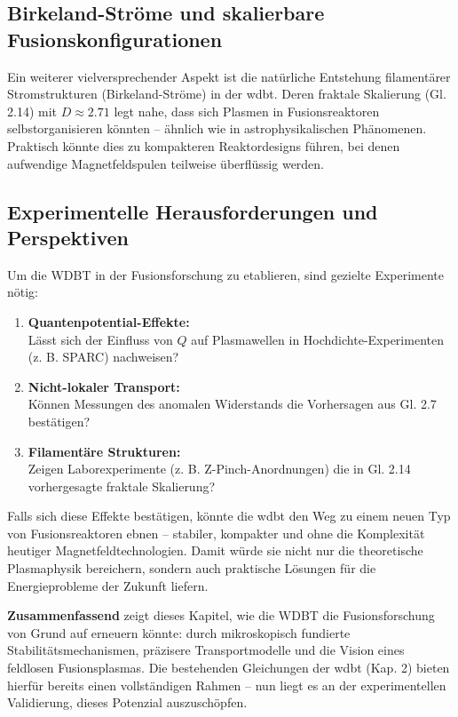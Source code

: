 \subsection{Birkeland-Ströme und skalierbare Fusionskonfigurationen}
Ein weiterer vielversprechender Aspekt ist die natürliche Entstehung filamentärer Stromstrukturen (Birkeland-Ströme) in der \gls{wdbt}. Deren fraktale Skalierung (Gl. 2.14) mit
$D \approx 2.71$ legt nahe, dass sich Plasmen in Fusionsreaktoren selbstorganisieren könnten – ähnlich wie in astrophysikalischen Phänomenen. Praktisch könnte dies zu kompakteren
Reaktordesigns führen, bei denen aufwendige Magnetfeldspulen teilweise überflüssig werden.

\subsection{Experimentelle Herausforderungen und Perspektiven}
Um die WDBT in der Fusionsforschung zu etablieren, sind gezielte Experimente nötig:

\begin{enumerate}
    \item \textbf{Quantenpotential-Effekte:}\\Lässt sich der Einfluss von $Q$ auf Plasmawellen in Hochdichte-Experimenten (z. B. SPARC) nachweisen?
    \item \textbf{Nicht-lokaler Transport:}\\Können Messungen des anomalen Widerstands die Vorhersagen aus Gl. 2.7 bestätigen?
    \item \textbf{Filamentäre Strukturen:}\\Zeigen Laborexperimente (z. B. Z-Pinch-Anordnungen) die in Gl. 2.14 vorhergesagte fraktale Skalierung?
\end{enumerate}

Falls sich diese Effekte bestätigen, könnte die \gls{wdbt} den Weg zu einem neuen Typ von Fusionsreaktoren ebnen – stabiler, kompakter und ohne die Komplexität heutiger
Magnetfeldtechnologien. Damit würde sie nicht nur die theoretische Plasmaphysik bereichern, sondern auch praktische Lösungen für die Energieprobleme der Zukunft liefern.

\textbf{Zusammenfassend} zeigt dieses Kapitel, wie die WDBT die Fusionsforschung von Grund auf erneuern könnte: durch mikroskopisch fundierte Stabilitätsmechanismen, präzisere
Transportmodelle und die Vision eines feldlosen Fusionsplasmas. Die bestehenden Gleichungen der \gls{wdbt} (Kap. 2) bieten hierfür bereits einen vollständigen Rahmen – nun liegt
es an der experimentellen Validierung, dieses Potenzial auszuschöpfen.
